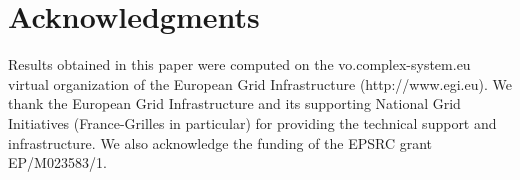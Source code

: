 \documentclass[10pt,letterpaper]{article}
\begin{document}
\section*{Acknowledgments}

Results obtained in this paper were computed on the vo.complex-system.eu virtual organization of the European Grid Infrastructure (http://www.egi.eu). We thank the European Grid Infrastructure and its supporting National Grid Initiatives (France-Grilles in particular) for providing the technical support and infrastructure. We also acknowledge the funding of the EPSRC grant EP/M023583/1.




\end{document}
